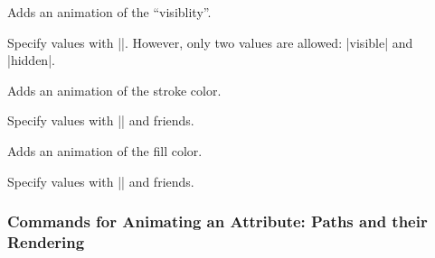\begin{command}{\pgfsys@animatevisibility}
  Adds an animation of the ``visiblity''.
  
  Specify values with |\pgfsys@animation@text|. However, only two values are allowed:
  |visible| and |hidden|.
\begin{codeexample}[width=2cm]
\end{codeexample}
\end{command}

\begin{command}{\pgfsys@animatestrokecolor}
  Adds an animation of the stroke color.

  Specify values with |\pgfsys@animation@color@rgb| and friends.
\begin{codeexample}[width=2cm]
\end{codeexample}
\end{command}

\begin{command}{\pgfsys@animatefillcolor}
  Adds an animation of the fill color.
  
  Specify values with |\pgfsys@animation@color@rgb| and friends.
\begin{codeexample}[width=2cm]
\end{codeexample}
\end{command}


\subsubsection{Commands for Animating an Attribute: Paths and their Rendering}

